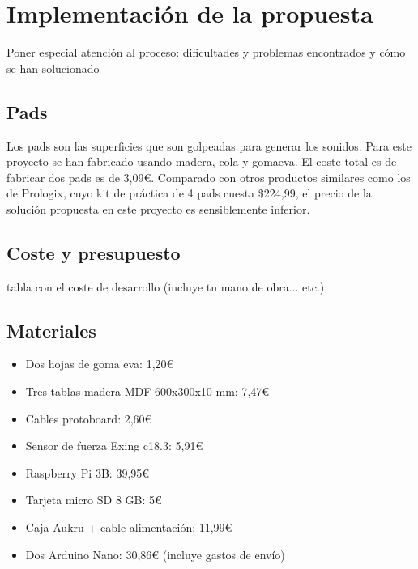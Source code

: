 \documentclass{article}
\begin{document}
\section{Implementación de la propuesta}\label{sec:Implementacion}

 Poner especial atención al proceso: dificultades y problemas encontrados y cómo se han solucionado

 \subsection{Pads}
 Los pads son las superficies que son golpeadas para generar los sonidos. Para este proyecto se han fabricado
 usando madera, cola y gomaeva\cite{GomaEva}. El coste total es de fabricar dos pads es de 3,09\euro{}. Comparado
 con otros productos similares como los de Prologix\cite{practice_pad}, cuyo kit de práctica de 4 pads cuesta
 \$224,99, el precio de la solución propuesta en este proyecto es sensiblemente inferior.

 \subsection{Coste y presupuesto}

  tabla con el coste de desarrollo (incluye tu mano de obra... etc.)

  \subsection{Materiales}
  \begin{itemize}
      \item Dos hojas de goma eva: 1,20\euro{}
      \item Tres tablas madera MDF 600x300x10 mm: 7,47\euro{}
      \item Cables protoboard: 2,60\euro{}
      \item Sensor de fuerza Exing c18.3: 5,91\euro{}
      \item Raspberry Pi 3B: 39,95\euro{}
      \item Tarjeta micro SD 8 GB: 5\euro{}
      \item Caja Aukru + cable alimentación: 11,99\euro{}
      \item Dos Arduino Nano: 30,86\euro{} (incluye gastos de envío)
  \end{itemize}
\end{document}
